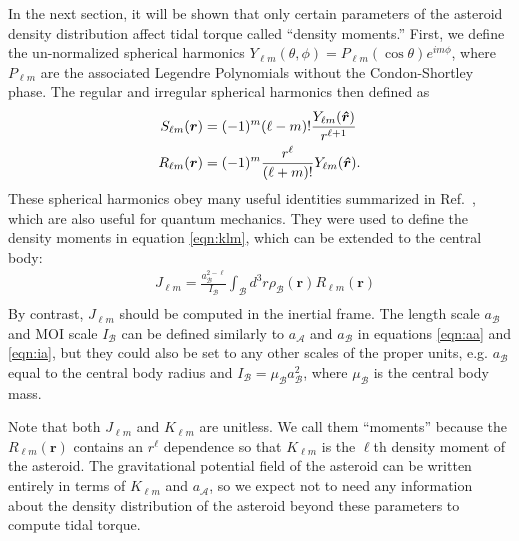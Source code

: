 In the next section, it will be shown that only certain parameters of the asteroid density distribution affect tidal torque called ``density moments.'' First, we define the un-normalized spherical harmonics $Y_{\ell m}(\theta, \phi) = P_{\ell m}(\cos \theta)e^{im\phi}$, where $P_{\ell m}$ are the associated Legendre Polynomials without the Condon-Shortley phase. The regular and irregular spherical harmonics then defined as
\begin{equation}
  \begin{split}
    S_{\ell m}(\bm r) &= (-1)^m (\ell - m)! \frac{Y_{\ell m}(\bm{\hat{r}})}{r^{\ell+1}} \\
    R_{\ell m} (\bm r) &= (-1)^m \frac{r^\ell}{(\ell + m)!} Y_{\ell m}(\bm{\hat{r}}).
  \end{split}
\end{equation}
These spherical harmonics obey many useful identities summarized in Ref.~\cite{Gelderen1998TheSO}, which are also useful for quantum mechanics. They were used to define the density moments in equation \ref{eqn:klm}, which can be extended to the central body:
\begin{equation}
  \begin{split}
    &J_{\ell m} = \frac{a_\mathcal{B}^{2-\ell}}{I_\mathcal{B}} \int_\mathcal{B} d^3 r \rho_\mathcal{B}(\bm r) R_{\ell m}(\bm r)\\
  \end{split}
  \label{eqn:jlm}
\end{equation}
By contrast, $J_{\ell m}$ should be computed in the inertial frame. The length scale $a_\mathcal{B}$ and MOI scale $I_\mathcal{B}$ can be defined similarly to $a_\mathcal{A}$ and $a_\mathcal{B}$ in equations \ref{eqn:aa} and \ref{eqn:ia}, but they could also be set to any other scales of the proper units, e.g. $a_\mathcal{B}$ equal to the central body radius and $I_\mathcal{B} = \mu_\mathcal{B}a_\mathcal{B}^2$, where $\mu_\mathcal{B}$ is the central body mass.

Note that both $J_{\ell m}$ and $K_{\ell m}$ are unitless. We call them ``moments'' because the $R_{\ell m}(\bm r)$ contains an $r^\ell$ dependence so that $K_{\ell m}$ is the $\ell$th density moment of the asteroid. The gravitational potential field of the asteroid can be written entirely in terms of $K_{\ell m}$ and $a_\mathcal{A}$, so we expect not to need any information about the density distribution of the asteroid beyond these parameters to compute tidal torque.

